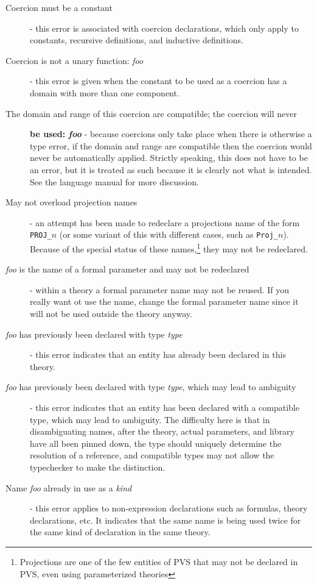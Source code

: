\begin{description}

\item[Coercion must be a constant] - this error is associated with
coercion declarations, which only apply to constants, recursive
definitions, and inductive definitions.

\item[Coercion is not a unary function: \emph{foo}] - this error is given
when the constant to be used as a coercion has a domain with more than one
component.

\item[The domain and range of this coercion are compatible; the coercion
will never] \textbf{be used: \emph{foo}} - because coercions only take place when
there is otherwise a type error, if the domain and range are compatible
then the coercion would never be automatically applied.  Strictly
speaking, this does not have to be an error, but it is treated as such
because it is clearly not what is intended.  See the language manual for
more discussion.

\item[May not overload projection names] - an attempt has been made to
redeclare a projections name of the form \texttt{PROJ\_}$n$ (or some
variant of this with different cases, such as \texttt{Proj\_}$n$).  Because
of the special status of these names,\footnote{Projections are one of the
few entities of PVS that may not be declared in PVS, even using
parameterized theories} they may not be redeclared.

\item[{\em foo\/} is the name of a formal parameter and may not be
redeclared] - within a theory a formal parameter name may not be reused.
If you really want ot use the name, change the formal parameter name since
it will not be used outside the theory anyway.

\item[{\em foo\/} has previously been declared with type {\em type\/}] -
this error indicates that an entity has already been declared in this
theory.

\item[{\em foo\/} has previously been declared with type {\em type\/},
which may lead to ambiguity] - this error indicates that an entity has
been declared with a compatible type, which may lead to ambiguity.  The
difficulty here is that in disambiguating names, after the theory, actual
parameters, and library have all been pinned down, the type should
uniquely determine the resolution of a reference, and compatible types may
not allow the typechecker to make the distinction.

\item[Name {\em foo\/} already in use as a {\em kind\/}] - this error
applies to non-expression declarations such as formulas, theory
declarations, etc.  It indicates that the same name is being used twice
for the same kind of declaration in the same theory.

\end{description}

